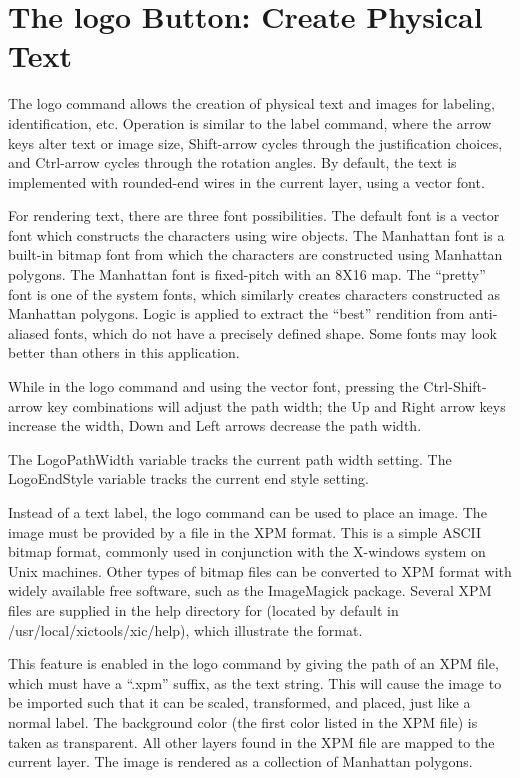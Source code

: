 \section{The {\cb logo} Button: Create Physical Text}
The {\cb logo} command allows the creation of physical text and images
for labeling, identification, etc.  Operation is similar to the {\cb
label} command, where the arrow keys alter text or image size, {\kb
Shift}-arrow cycles through the justification choices, and {\kb
Ctrl}-arrow cycles through the rotation angles.  By default, the text
is implemented with rounded-end wires in the current layer, using a
vector font.

For rendering text, there are three font possibilities.  The default
font is a vector font which constructs the characters using wire
objects.  The Manhattan font is a built-in bitmap font from which the
characters are constructed using Manhattan polygons.  The Manhattan
font is fixed-pitch with an 8X16 map.  The ``pretty'' font is one of
the system fonts, which similarly creates characters constructed as
Manhattan polygons.  Logic is applied to extract the ``best''
rendition from anti-aliased fonts, which do not have a precisely
defined shape.  Some fonts may look better than others in this
application.

While in the {\cb logo} command and using the vector font, pressing
the {\kb Ctrl-Shift}-arrow key combinations will adjust the path
width; the {\kb Up} and {\kb Right} arrow keys increase the width,
{\kb Down} and {\kb Left} arrows decrease the path width.

The {\et LogoPathWidth} variable tracks the current path width
setting.  The {\et LogoEndStyle} variable tracks the current end style
setting.

Instead of a text label, the {\cb logo} command can be used to place
an image.  The image must be provided by a file in the XPM format. 
This is a simple ASCII bitmap format, commonly used in conjunction
with the X-windows system on Unix machines.  Other types of bitmap
files can be converted to XPM format with widely available free
software, such as the ImageMagick package.  Several XPM files are
supplied in the help directory for {\Xic} (located by default in {\vt
/usr/local/xictools/xic/help}), which illustrate the format.

This feature is enabled in the {\cb logo} command by giving the path
of an XPM file, which must have a ``{\vt .xpm}'' suffix, as the text
string.  This will cause the image to be imported such that it can be
scaled, transformed, and placed, just like a normal label.  The
background color (the first color listed in the XPM file) is taken as
transparent.  All other layers found in the XPM file are mapped to the
current layer.  The image is rendered as a collection of Manhattan
polygons.

